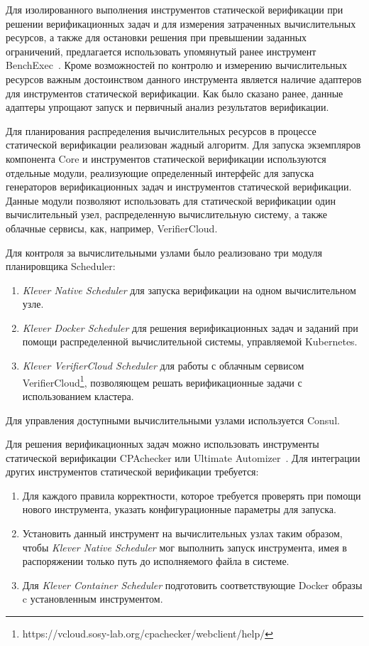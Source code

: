 \documentclass[%
candidate,     %
href,        %
colorlinks,  %
]{disser}
\begin{document}
Для изолированного выполнения инструментов статической верификации при решении верификационных задач и для измерения затраченных вычислительных ресурсов, а также для остановки решения при превышении заданных ограничений, предлагается использовать упомянутый ранее инструмент BenchExec~\cite{Beyer2015}.
Кроме возможностей по контролю и измерению вычислительных ресурсов важным достоинством данного инструмента является наличие адаптеров для инструментов статической верификации.
Как было сказано ранее, данные адаптеры упрощают запуск и первичный анализ результатов верификации.

Для планирования распределения вычислительных ресурсов в процессе статической верификации реализован жадный алгоритм.
Для запуска экземпляров компонента Core и инструментов статической верификации используются отдельные модули, реализующие определенный интерфейс для запуска генераторов верификационных задач и инструментов статической верификации.
Данные модули позволяют использовать для статической верификации один вычислительный узел, распределенную вычислительную систему, а также облачные сервисы, как, например, \mbox{VerifierCloud}.

Для контроля за вычислительными узлами было реализовано три модуля планировщика \mbox{Scheduler}:
\begin{enumerate}
\item \textit{Klever Native Scheduler} для запуска верификации на одном вычислительном узле.
\item \textit{Klever Docker Scheduler} для решения верификационных задач и заданий при помощи распределенной вычислительной системы, управляемой Kubernetes.
\item \textit{Klever VerifierCloud Scheduler} для работы с облачным сервисом VerifierCloud\footnote{https://vcloud.sosy-lab.org/cpachecker/webclient/help/}, позволяющем решать верификационные задачи с использованием кластера.
\end{enumerate}
Для управления доступными вычислительными узлами используется Consul.

Для решения верификационных задач можно использовать инструменты статической верификации CPAchecker или Ultimate Automizer~\cite{Heizmann2015}.
Для интеграции других инструментов статической верификации требуется:
\begin{enumerate}
\item Для каждого правила корректности, которое требуется проверять при помощи нового инструмента, указать конфигурационные параметры для запуска.
\item Установить данный инструмент на вычислительных узлах таким образом, чтобы \textit{Klever Native Scheduler} мог выполнить запуск инструмента, имея в распоряжении только путь до исполняемого файла в системе.
\item Для \textit{Klever Container Scheduler} подготовить соответствующие Docker образы c установленным инструментом.
\end{enumerate}
\end{document}

